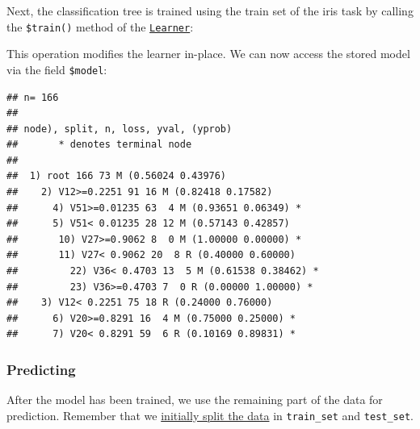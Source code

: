 \documentclass[]{article}
\newenvironment{Shaded}{\begin{snugshade}}{\end{snugshade}}
\newcommand{\DataTypeTok}[1]{\textcolor[rgb]{0.13,0.29,0.53}{#1}}
\newcommand{\KeywordTok}[1]{\textcolor[rgb]{0.13,0.29,0.53}{\textbf{#1}}}
\newcommand{\NormalTok}[1]{#1}
\newcommand{\OperatorTok}[1]{\textcolor[rgb]{0.81,0.36,0.00}{\textbf{#1}}}
\newcommand{\StringTok}[1]{\textcolor[rgb]{0.31,0.60,0.02}{#1}}
\renewenvironment{Shaded} {\begin{snugshade}\small} {\end{snugshade}}
\begin{document}
Next, the classification tree is trained using the train set of the iris task by calling the \texttt{\$train()} method of the \href{https://mlr3.mlr-org.com/reference/Learner.html}{\texttt{Learner}}:

\begin{Shaded}
\end{Shaded}

This operation modifies the learner in-place.
We can now access the stored model via the field \texttt{\$model}:

\begin{Shaded}
\end{Shaded}

\begin{verbatim}
## n= 166 
## 
## node), split, n, loss, yval, (yprob)
##       * denotes terminal node
## 
##  1) root 166 73 M (0.56024 0.43976)  
##    2) V12>=0.2251 91 16 M (0.82418 0.17582)  
##      4) V51>=0.01235 63  4 M (0.93651 0.06349) *
##      5) V51< 0.01235 28 12 M (0.57143 0.42857)  
##       10) V27>=0.9062 8  0 M (1.00000 0.00000) *
##       11) V27< 0.9062 20  8 R (0.40000 0.60000)  
##         22) V36< 0.4703 13  5 M (0.61538 0.38462) *
##         23) V36>=0.4703 7  0 R (0.00000 1.00000) *
##    3) V12< 0.2251 75 18 R (0.24000 0.76000)  
##      6) V20>=0.8291 16  4 M (0.75000 0.25000) *
##      7) V20< 0.8291 59  6 R (0.10169 0.89831) *
\end{verbatim}

\hypertarget{predicting}{%
\subsubsection{Predicting}\label{predicting}}

After the model has been trained, we use the remaining part of the data for prediction.
Remember that we \protect\hyperlink{split-data}{initially split the data} in \texttt{train\_set} and \texttt{test\_set}.

\begin{Shaded}
\end{Shaded}
\end{document}
